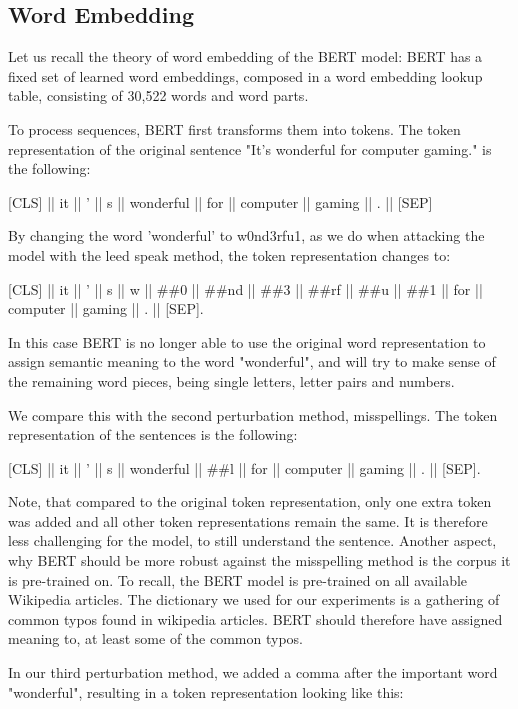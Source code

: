 \subsection{Word Embedding}
Let us recall the theory of word embedding of the BERT model:
BERT has a fixed set of learned word embeddings, composed in a word embedding lookup table, consisting of 30,522 words and word parts. 

To process sequences, BERT first transforms them into tokens. The token representation of the original sentence "It’s wonderful for computer gaming." is the following:


{[}CLS{]}  ||  it  ||  '  ||  s  ||  wonderful  ||  for  ||  computer  ||  gaming  ||  .  ||  {[}SEP{]} 


By changing the word 'wonderful' to w0nd3rfu1, as we do when attacking the model with the leed speak method, the token representation changes to:

{[}CLS{]}  ||  it  ||  '  ||  s  ||  w  ||  \#\#0  ||  \#\#nd  ||  \#\#3  ||  \#\#rf  ||  \#\#u  ||  \#\#1  ||  for  ||  computer  ||  gaming  ||  .  ||  {[}SEP{]}.

In this case BERT is no longer able to use the original word representation to assign semantic meaning to the word "wonderful", and will try to make sense of the remaining word pieces, being single letters, letter pairs and numbers.

We compare this with the second perturbation method, misspellings. The token representation of the sentences is the following:

{[}CLS{]}  ||  it  ||  '  ||  s  ||  wonderful  ||  \#\#l  ||  for  ||  computer  ||  gaming  ||  .  ||  {[}SEP{]}.

Note, that compared to the original token representation, only one extra token was added and all other token representations remain the same. It is therefore less challenging for the model, to still understand the sentence. Another aspect, why BERT should be more robust against the misspelling method is the corpus it is pre-trained on. To recall, the BERT model is pre-trained on all available Wikipedia articles. The dictionary we used for our experiments is a gathering of common typos found in wikipedia articles. BERT should therefore have assigned meaning to, at least some of the common typos.


In our third perturbation method, we added a comma after the important word "wonderful", resulting in a token representation looking like this:

